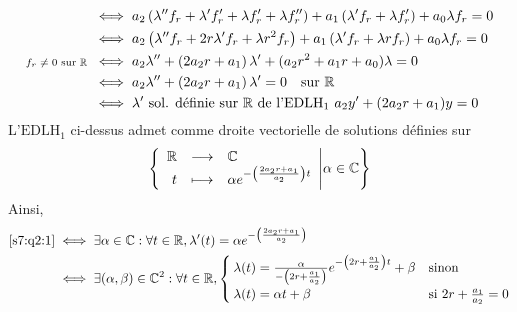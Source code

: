 \documentclass{article}
\renewenvironment{question_kholle}[2][ ]
{
	\subsection{\texorpdfstring{#2}{}}
	\notblank{#1}
	{
		\noindent #1
		\bigbreak
	}
	{}
	\begin{proof}
}
{
	\end{proof}
}
\begin{document}
\begin{question_kholle}
\begin{align}
		                                        & \iff a_{2} \left(\lambda'' f_{r} + \lambda' f_{r}' + \lambda f_{r}' + \lambda f_{r}''\right) + a_{1} \left(\lambda' f_{r} + \lambda f_{r}'\right) + a_{0} \lambda f_{r} = 0                              \nonumber \\
		                                        & \iff a_{2} \left(\lambda'' f_{r} + 2r \lambda' f_{r} + \lambda r^{2} f_{r}\right) + a_{1} \left(\lambda' f_{r} + \lambda r f_{r}\right)+ a_{0} \lambda f_{r} = 0                                     \nonumber     \\
		\text{\scriptsize $f_{r}\neq 0$ sur \ensuremath{\mathbb R} } & \iff a_{2} \lambda'' + \left(2a_{2}r + a_{1}\right)\lambda' + (a_{2}r^{2} + a_{1}r + a_{0})\lambda = 0                                                                                  \nonumber                  \\
		                                        & \iff a_{2} \lambda'' + \left(2a_{2}r +a_{1}\right)\lambda' = 0 \quad\text{sur } \mathbb R                                                                                          \nonumber                              \\
		                                        & \iff \lambda' \text{ sol. définie sur \ensuremath{\mathbb R} de l'$\mathrm{EDLH_{1}}$ } a_{2}y' + (2a_{2}r + a_{1})y=0 \label{s7:q2:1}
	\end{align}
	L'$\mathrm{EDLH_{1}}$ ci-dessus admet comme droite vectorielle de solutions définies sur \R
	\[
		\left\{\begin{array}{rcl} \mathbb R & \longrightarrow & \mathbb C \\ t & \longmapsto & \alpha e^{-\left(\frac{2a_{2}r+a_{1}}{a_{2}}\right)t} \end{array} \middle | \alpha\in\mathbb C\right\}
	\]
	Ainsi,
	\begin{align*}
		\eqref{s7:q2:1} & \iff \exists \alpha\in\mathbb C: \forall t\in\mathbb R, \lambda'(t)=\alpha e^{-\left(\frac{2a_{2}r + a_{1}}{a_{2}}\right)}                                                                                                                                                   \\
		                & \iff \exists (\alpha, \beta)\in\mathbb C^{2}: \forall t\in\mathbb R, \begin{cases}
			                                                                         \lambda(t)=\frac{\alpha}{-\left(2r+\frac{a_{1}}{a_{2}}\right)}e^{-\left(2r+\frac{a_{1}}{a_{2}}\right)t}+\beta & \text{sinon}                        \\
			                                                                         \lambda(t)=\alpha t+\beta                                                                                     & \text{si } 2r+\frac{a_{1}}{a_{2}}=0

\end{cases}
\end{align*}
\end{question_kholle}
\end{document}
